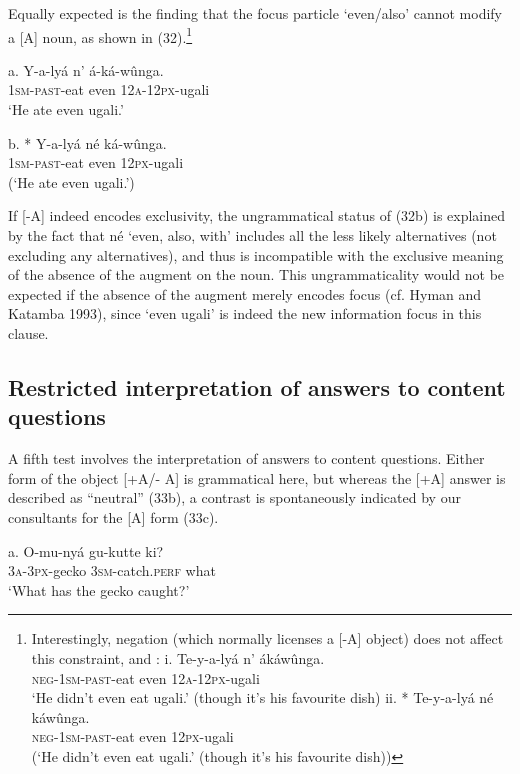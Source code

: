 \documentclass[output=paper]{langsci/langscibook}
\begin{document}
Equally expected is the finding that the focus particle ‘even/also’ cannot modify a [A] noun, as shown in (32).\footnote{%
  Interestingly, negation (which normally licenses a [-A] object) does not affect this constraint, and :
    \ea
      \ea
      \gll i.  Te-y-a-lyá    n’  ákáwûnga.\\
	\textsc{neg}-\textsc{1sm}-\textsc{past}-eat  even  \textsc{12a}-\textsc{12px}-ugali\\
      \glt   ‘He didn’t even eat ugali.’ (though it’s his favourite dish)
      \ex
      \gll ii.  * Te-y-a-lyá    né  káwûnga.\\
	\textsc{neg}-\textsc{1sm}-\textsc{past}-eat  even  \textsc{12px}-ugali\\
	(‘He didn’t even eat ugali.’ (though it’s his favourite dish))
      \z
    \z
}

\ea
\gll   a.  Y-a-lyá    n’  á-ká-wûnga.\\
         \textsc{1sm}-\textsc{past}-eat  even  \textsc{12a}-\textsc{12px}-ugali\\
\glt     ‘He ate even ugali.’
\z

\ea
\gll   b.  * Y-a-lyá    né  ká-wûnga.\\
         \textsc{1sm}-\textsc{past}-eat  even  \textsc{12px}-ugali\\
\glt     (‘He ate even ugali.’)
\z

If [-A] indeed encodes exclusivity, the ungrammatical status of (32b) is explained by the fact that né ‘even, also, with’ includes all the less likely alternatives (not excluding any alternatives), and thus is incompatible with the exclusive meaning of the absence of the augment on the noun. This ungrammaticality would not be expected if the absence of the augment merely encodes focus (cf. Hyman and Katamba 1993), since ‘even ugali’ is indeed the new information focus in this clause.

\subsection{Restricted interpretation of answers to content questions} %

A fifth test involves the interpretation of answers to content questions. Either form of the object [+A/- A] is grammatical here, but whereas the [+A] answer is described as “neutral” (33b), a contrast is spontaneously indicated by our consultants for the [A] form (33c). 

\ea
\gll   a.  O-mu-nyá    gu-kutte    ki?\\
         \textsc{3a}-\textsc{3px}-gecko  \textsc{3sm}-catch.\textsc{perf}  what\\
\glt     ‘What has the gecko caught?’
\z
\end{document}
